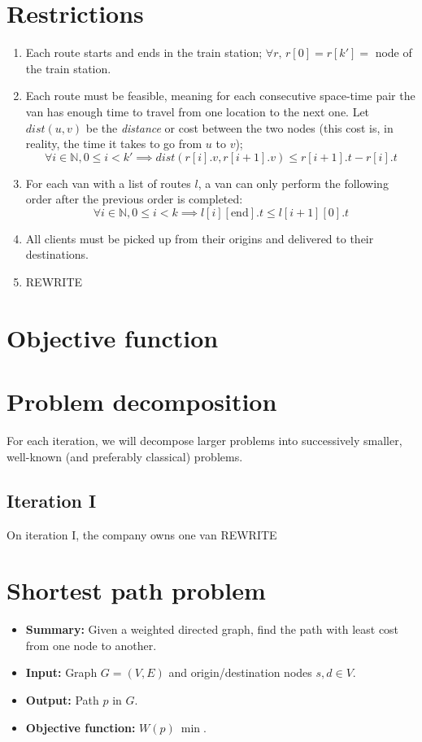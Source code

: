 \documentclass{report}[a4paper]
\theoremstyle{remark}
\begin{document}
\section{Restrictions}
\begin{enumerate}
    \item Each route starts and ends in the train station; $\forall r,\,r[0]=r[k']=$ node of the train station.
    \item Each route must be feasible, meaning for each consecutive space-time pair the van has enough time to travel from one location to the next one. Let $dist(u, v)$ be the \emph{distance} or cost between the two nodes (this cost is, in reality, the time it takes to go from $u$ to $v$);
    \begin{equation*}
        \forall i \in \mathbb{N}, 0 \leq i < k' \implies dist(r[i].v, r[i+1].v) \leq r[i+1].t-r[i].t
    \end{equation*}
    \item For each van with a list of routes $l$, a van can only perform the following order after the previous order is completed:
    \begin{equation*}
        \forall i \in \mathbb{N}, 0 \leq i < k \implies l[i][\text{end}].t \leq l[i+1][0].t
    \end{equation*}
    \item All clients must be picked up from their origins and delivered to their destinations.
    \item REWRITE
\end{enumerate}
\section{Objective function}
\section{Problem decomposition}
For each iteration, we will decompose larger problems into successively smaller, well-known (and preferably classical) problems.
\subsection{Iteration I}
On iteration I, the company owns one van REWRITE
\section{Shortest path problem}
\begin{itemize}
    \item \textbf{Summary:} Given a weighted directed graph, find the path with least cost from one node to another.
    \item \textbf{Input:} Graph $G=(V,E)$ and origin/destination nodes $s, d \in V$.
    \item \textbf{Output:} Path $p$ in $G$.
    \item \textbf{Objective function:} $W(p)~\min$.
\end{itemize}
\end{document}
